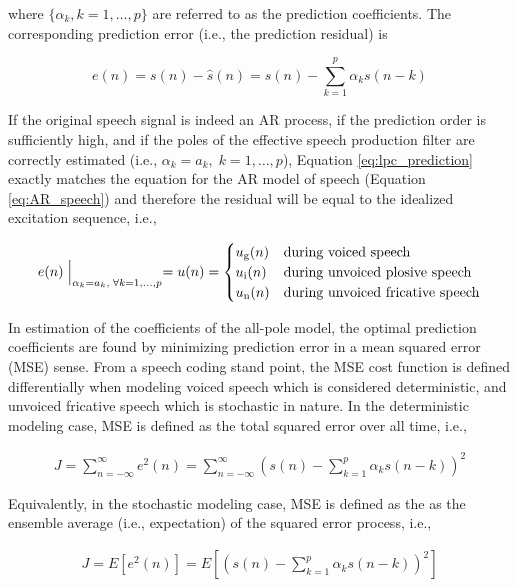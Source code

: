 \noindent
where $\{\alpha_k, k=1,\dots,p\}$ are referred to as the prediction coefficients. The corresponding prediction error (i.e., the prediction residual) is

\begin{equation}
	e(n)= s(n) - \hat{s}(n) =  s(n)  - \sum_{k=1}^{p}\alpha_k s(n-k) \label{eq:lpc_error}
\end{equation}


If the original speech signal is indeed an AR process, if the prediction order is sufficiently high, and if the poles of the effective speech production filter are correctly estimated (i.e., $\alpha_k=a_k, \; k=1,\dots,p$), Equation \ref{eq:lpc_prediction} exactly matches the equation for the AR model of speech (Equation \ref{eq:AR_speech}) and therefore the residual will be equal to the idealized excitation sequence, i.e., 

\begin{equation}
	e(n)\Bigm|_{\alpha_k=a_k, \; \forall k=1,\dots,p} = u(n) = 
	\begin{cases} 
		u_\mathrm{g}(n) & \text{during voiced speech} \\
		u_\mathrm{i}(n)  & \text{during unvoiced plosive speech} \\
		u_\mathrm{n}(n) & \text{during unvoiced fricative speech} \\
	\end{cases}
\end{equation}

In estimation of the coefficients of the all-pole model, the optimal prediction coefficients are found by minimizing prediction error in a mean squared error (MSE) sense. From a speech coding stand point, the MSE cost function is defined differentially when modeling voiced speech which is considered deterministic, and unvoiced fricative speech which is stochastic in nature. In the deterministic modeling case, MSE is defined as the total squared error over all time, i.e.,

\begin{eqnarray}
	J = \sum_{n=-\infty}^{\infty}e^2(n) = \sum_{n=-\infty}^{\infty} \left(s(n)  - \sum_{k=1}^{p}\alpha_k s(n-k)\right) ^2 \label{eq:lp_mse_deterministic}
\end{eqnarray}

Equivalently, in the stochastic modeling case, MSE is defined as the as the ensemble average (i.e., expectation) of the squared error process, i.e.,

\begin{eqnarray}
	J = E \left[ e^2(n) \right] = E\left[ \left(s(n)  - \sum_{k=1}^{p}\alpha_k s(n-k) \right) ^2\right]
\end{eqnarray}

